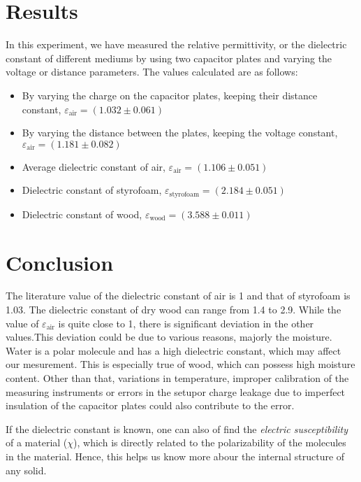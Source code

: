 \section{Results}
In this experiment, we have measured the relative permittivity, or the dielectric constant of different mediums by using two capacitor plates and varying the voltage or distance parameters. The values calculated are as follows:\\

\begin{itemize}
    \item By varying the charge on the capacitor plates, keeping their distance constant, $\varepsilon_\text{air}= (1.032\pm0.061)$
    \item By varying the distance between the plates, keeping the voltage constant, $\varepsilon_\text{air} = (1.181\pm0.082)$
    \item Average dielectric constant of air, $\varepsilon_\text{air} = (1.106\pm0.051)$
    \item Dielectric constant of styrofoam, $\varepsilon_\text{styrofoam} = (2.184\pm0.051)$
    \item Dielectric constant of wood, $\varepsilon_\text{wood} = (3.588\pm0.011)$
\end{itemize}

\section{Conclusion}
The literature value of the dielectric constant of air is 1 and that of styrofoam is 1.03. The dielectric constant of dry wood can range from 1.4 to 2.9. While the value of $\varepsilon_\text{air}$ is quite close to 1, there is significant deviation in the other values.This deviation could be due to various reasons, majorly the moisture. Water is a polar molecule and has a high dielectric constant, which may affect our mesurement. This is especially true of wood, which can possess high moisture content. Other than that, variations in temperature, improper calibration of the measuring instruments or errors in the setupor charge leakage due to imperfect insulation of the capacitor plates could also contribute to the error.

If the dielectric constant is known, one can also of find the \textit{electric susceptibility} of a material ($\chi$), which is directly related to the polarizability of the molecules in the material. Hence, this helps us know more abour the internal structure of any solid.


